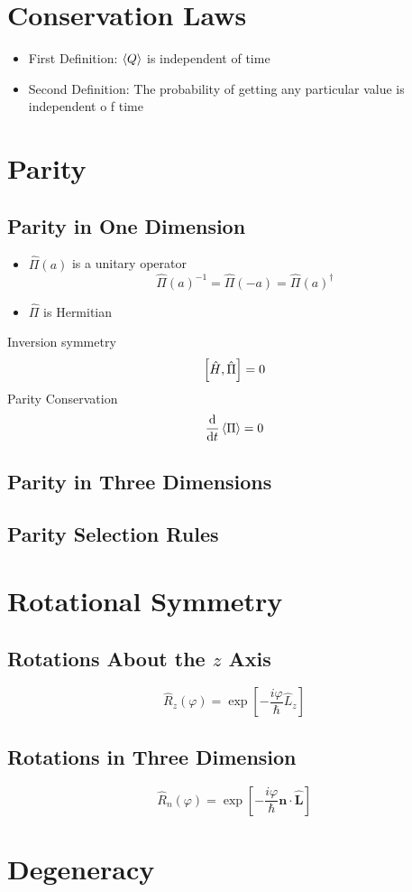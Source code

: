 \section{Conservation Laws}
\begin{itemize}
    \item First Definition: \(\expval{Q}\) is independent of time
    \item Second Definition: The probability of getting any particular value is independent o f time
\end{itemize}
\section{Parity}
\subsection{Parity in One Dimension}
\begin{itemize}
    \item \(\hat{\Pi}(a)\) is a unitary operator
    \[\hat{\Pi}(a)^{-1}=\hat{\Pi}(-a)=\hat{\Pi}(a)^\dagger \]
    \item \(\hat{\Pi}\) is Hermitian
\end{itemize}
Inversion symmetry
\[\qty[\hat{H},\hat{\Pi}]=0\]
Parity Conservation
\[\dv{t}\expval{\Pi}=0\]
\subsection{Parity in Three Dimensions}
\subsection{Parity Selection Rules}
\section{Rotational Symmetry}
\subsection{Rotations About the $z$ Axis}
\[\hat{R}_z(\varphi)=\exp[-\frac{i\varphi}{\hbar}\hat{L}_z]\]
\subsection{Rotations in Three Dimension}
\[\boxed{
    \hat{R}_n(\varphi)=\exp[-\frac{i\varphi}{\hbar}\mathbf{n}\cdot\hat{\mathbf{L}}]
}\]
\section{Degeneracy}
